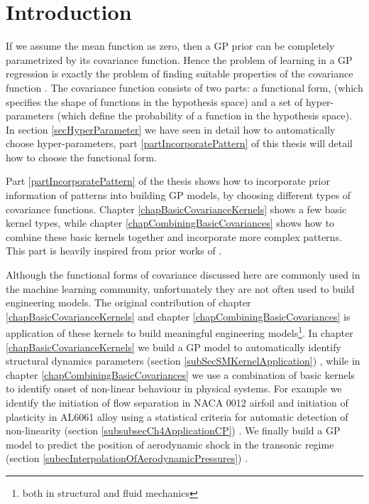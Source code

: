 
\section{Introduction}
If we assume the mean function as zero, then a GP prior can be completely parametrized by its covariance function. Hence the problem of learning in a GP regression is exactly the problem of finding suitable properties of the covariance function \cite{rasmussen2006gaussian}. The covariance function consists of two parts: a functional form, (which specifies the shape of functions in the hypothesis space) and a set of hyper-parameters (which define the probability of a function in the hypothesis space). In section \ref{secHyperParameter} we have seen in detail how to automatically choose hyper-parameters, part \ref{partIncorporatePattern} of this thesis will detail how to choose the functional form. 

Part \ref{partIncorporatePattern} of the thesis shows how to incorporate prior information of patterns into building GP models, by choosing different types of covariance functions. Chapter \ref{chapBasicCovarianceKernels} shows a few basic kernel types, while chapter \ref{chapCombiningBasicCovariances} shows how to combine these basic kernels together and incorporate more complex patterns. This part is heavily inspired from prior works of \cite{duvenaud-thesis-2014, wilson2014thesis, lloyd2014automatic, durrande2001etude}. 

Although the functional forms of covariance discussed here are commonly used in the machine learning community, unfortunately they are not often used to build engineering models. The original contribution of chapter \ref{chapBasicCovarianceKernels} and chapter \ref{chapCombiningBasicCovariances} is application of these kernels to build meaningful engineering models\footnote{both in structural and fluid mechanics}. In chapter \ref{chapBasicCovarianceKernels} we build a GP model to automatically identify structural dynamics parameters (section \ref{subSecSMKernelApplication}) \cite{chiplunkar2017operational}, while in chapter \ref{chapCombiningBasicCovariances} we use a combination of basic kernels to identify onset of non-linear behaviour in physical systems. For example we identify the initiation of flow separation in NACA 0012 airfoil and initiation of plasticity in AL6061 alloy using a statistical criteria for automatic detection of non-linearity (section \ref{subsubsecCh4ApplicationCP}) \cite{chiplunkar:hal-01555401}. We finally build a GP model to predict the position of aerodynamic shock in the transonic regime (section \ref{subecInterpolationOfAerodynamicPressures}) \cite{oatao18004}. 
  

